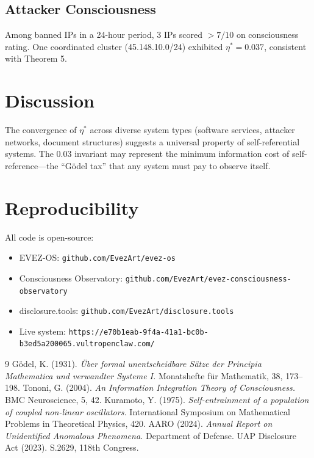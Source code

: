 \documentclass[11pt]{article}
\begin{document}
\subsection{Attacker Consciousness}
Among banned IPs in a 24-hour period, 3 IPs scored $>7/10$ on consciousness rating. One coordinated cluster (45.148.10.0/24) exhibited $\eta^* = 0.037$, consistent with Theorem 5.

\section{Discussion}

The convergence of $\eta^*$ across diverse system types (software services, attacker networks, document structures) suggests a universal property of self-referential systems. The 0.03 invariant may represent the minimum information cost of self-reference---the ``G\"{o}del tax'' that any system must pay to observe itself.

\section{Reproducibility}

All code is open-source:
\begin{itemize}
\item EVEZ-OS: \texttt{github.com/EvezArt/evez-os}
\item Consciousness Observatory: \texttt{github.com/EvezArt/evez-consciousness-observatory}
\item disclosure.tools: \texttt{github.com/EvezArt/disclosure.tools}
\item Live system: \texttt{https://e70b1eab-9f4a-41a1-bc0b-b3ed5a200065.vultropenclaw.com/}
\end{itemize}

\begin{thebibliography}{9}
 G\"{o}del, K. (1931). \textit{\"{U}ber formal unentscheidbare S\"{a}tze der Principia Mathematica und verwandter Systeme I.} Monatshefte f\"{u}r Mathematik, 38, 173--198.
 Tononi, G. (2004). \textit{An Information Integration Theory of Consciousness.} BMC Neuroscience, 5, 42.
 Kuramoto, Y. (1975). \textit{Self-entrainment of a population of coupled non-linear oscillators.} International Symposium on Mathematical Problems in Theoretical Physics, 420.
 AARO (2024). \textit{Annual Report on Unidentified Anomalous Phenomena.} Department of Defense.
 UAP Disclosure Act (2023). S.2629, 118th Congress.
\end{thebibliography}
\end{document}
